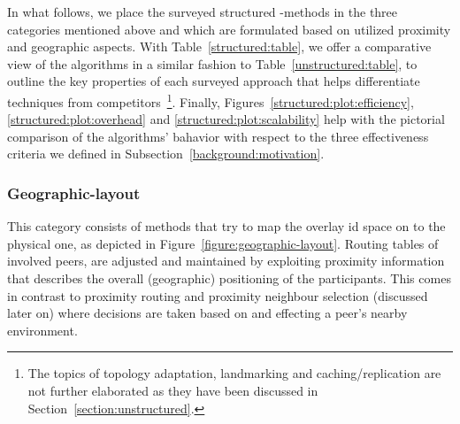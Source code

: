 In what follows, we place the surveyed structured \p-methods in 
the three categories mentioned above and which are formulated based 
on utilized proximity and geographic aspects.
With Table~\ref{structured:table}, we offer a comparative view
of the algorithms in a similar fashion to Table~\ref{unstructured:table}, 
to outline the key properties of each surveyed approach 
that helps differentiate techniques from
competitors~\footnote{The topics of topology adaptation, landmarking and
caching/replication are not further elaborated as they have been discussed 
in Section~\ref{section:unstructured}.}.
Finally, Figures~\ref{structured:plot:efficiency}, \ref{structured:plot:overhead}
and \ref{structured:plot:scalability} help with the pictorial comparison
of the algorithms' bahavior with respect to the three effectiveness
criteria we defined in Subsection~\ref{background:motivation}.

\subsubsection{Geographic-layout} \label{section:geographic_layout}


This category consists of methods that try to map the overlay id space on to
the physical one, as depicted in Figure~\ref{figure:geographic-layout}.
Routing tables of involved peers, are adjusted and maintained by exploiting
proximity information that describes the overall (geographic) positioning of
the participants. This comes in contrast to proximity routing and proximity neighbour
selection (discussed later on) where decisions are taken based on and effecting
a peer's nearby environment.

